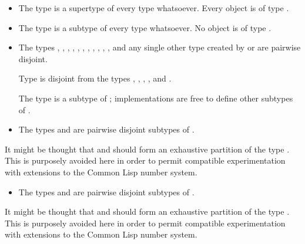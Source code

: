 \begin{itemize}
\item
The type  is a supertype of every type whatsoever.
Every object is of type .

\item
The type {\nil} is a subtype of every type whatsoever.
No object is of type {\nil}.
\end{itemize}

\begin{itemize}
\item
The types , , , , ,
, , , ,
, , and any single other type created by
 or 
are pairwise disjoint.

Type 
is disjoint from the types , , , ,
and .

The type  is a subtype of ;
implementations are free to define other subtypes of .
\end{itemize}

\begin{itemize}
\item
The types  and  are pairwise disjoint
subtypes of .
\end{itemize}

\beforenoterule
\begin{rationale}
It might be thought that  and  should
form an exhaustive partition of the type .  This is purposely
avoided here in order to permit compatible experimentation with extensions
to the Common Lisp number system.
\end{rationale}
\afternoterule

\begin{itemize}
\item
The types  and  are pairwise disjoint
subtypes of .
\end{itemize}

\beforenoterule
\begin{rationale}
It might be thought that  and  should
form an exhaustive partition of the type .  This is purposely
avoided here in order to permit compatible experimentation with extensions
to the Common Lisp number system.
\end{rationale}
\afternoterule

